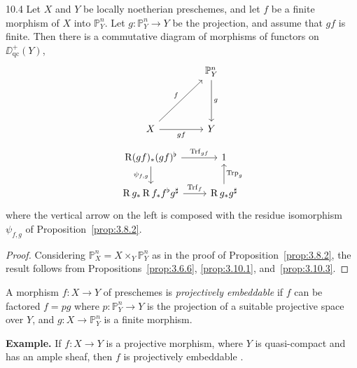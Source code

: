 \begin{bookproposition}{10.4}\label{prop:3.10.4}
Let $X$ and $Y$ be locally noetherian preschemes, and let $f$ be a finite morphism of $X$ into $\mathbb{P}^n_Y$. Let $g\colon \mathbb{P}^n_Y\to Y$ be the projection, and assume that $gf$ is finite. Then there is a commutative diagram of morphisms of functors on $\DD_{\mathrm{qc}}^+(Y)$,
\[
\begin{tikzcd}[row sep=1.5cm, column sep=1.5cm]
	& \mathbb{P}^n_Y \arrow[d, "g"] \\
	X \arrow[ur, "f"] \arrow[r, "gf"'] & Y
\end{tikzcd}
\]
\[
\begin{tikzcd}
\RR(gf)_* (gf)^{\flat} \arrow[r, "\operatorname{Trf}_{gf}"] \arrow[d, "\psi_{f,g}"'] & 1 \\
\RR g_* \RR f_* f^{\flat} g^{\sharp} \arrow[r, "\operatorname{Trf}_f"] & \RR g_* g^{\sharp} \arrow[u, "\operatorname{Trp}_g"']
\end{tikzcd}
\]
where the vertical arrow on the left is  composed with the residue isomorphism $\psi_{f,g}$ of Proposition~\ref{prop:3.8.2}.
\end{bookproposition}

\begin{proof}
Considering $\mathbb{P}_X^n=X\times_Y\mathbb{P}_Y^n$ as in the proof of Proposition~\ref{prop:3.8.2}, the result follows from Propositions~\ref{prop:3.6.6}, \ref{prop:3.10.1}, and~\ref{prop:3.10.3}.
\end{proof}

\begin{definition*}
A morphism $f\colon X\to Y$ of preschemes is \emph{projectively embeddable} if $f$ can be factored $f=pg$ where $p\colon\mathbb{P}^n_Y\to Y$ is the projection of a suitable projective space over $Y$, and $g\colon X\to\mathbb{P}^n_Y$ is a finite morphism.
\end{definition*}

\textbf{Example.}
If $f\colon X\to Y$ is a projective morphism, where $Y$ is quasi-compact and has an ample sheaf, then $f$ is projectively embeddable \cite[\nopp II,~5.5.4(ii)]{EGA}.

